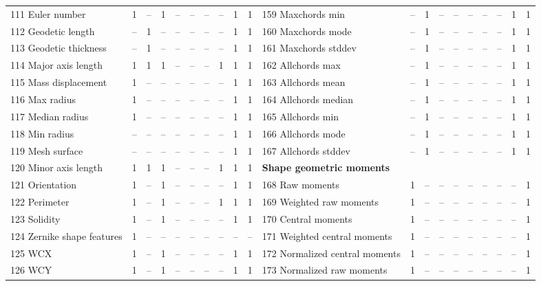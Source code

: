 \documentclass[sn-mathphys,Numbered]{sn-jnl}%
\theoremstyle{thmstyleone}%
\theoremstyle{thmstyletwo}%
\theoremstyle{thmstylethree}%
\begin{document}
\begin{table} [!hbt]
\begin{tiny}
\begin{tabular} {l c c c c c c c c c l c c c c c c c c c }
 111 Euler number & 1 & -- & 1 & -- & -- & -- & -- & 1 & 1 &  159 Maxchords min & -- & 1 & -- & -- & -- & -- & -- & 1 & 1 \\
 112 Geodetic length & -- & 1 & -- & -- & -- & -- & -- & 1 & 1 &  160 Maxchords mode & -- & 1 & -- & -- & -- & -- & -- & 1 & 1 \\
 113 Geodetic thickness & -- & 1 & -- & -- & -- & -- & -- & 1 & 1 &  161 Maxchords stddev & -- & 1 & -- & -- & -- & -- & -- & 1 & 1 \\
 114 Major axis length & 1 & 1 & 1 & -- & -- & -- & 1 & 1 & 1 &  162 Allchords max & -- & 1 & -- & -- & -- & -- & -- & 1 & 1 \\
 115 Mass displacement & 1 & -- & -- & -- & -- & -- & -- & 1 & 1 &  163 Allchords mean & -- & 1 & -- & -- & -- & -- & -- & 1 & 1 \\
 116 Max radius & 1 & -- & -- & -- & -- & -- & -- & 1 & 1 &  164 Allchords median & -- & 1 & -- & -- & -- & -- & -- & 1 & 1 \\
 117 Median radius & 1 & -- & -- & -- & -- & -- & -- & 1 & 1 &  165 Allchords min & -- & 1 & -- & -- & -- & -- & -- & 1 & 1 \\
 118 Min radius & -- & -- & -- & -- & -- & -- & -- & 1 & 1 &  166 Allchords mode & -- & 1 & -- & -- & -- & -- & -- & 1 & 1 \\
 119 Mesh surface & -- & -- & -- & -- & -- & -- & -- & 1 & 1 &  167 Allchords stddev & -- & 1 & -- & -- & -- & -- & -- & 1 & 1 \\
 120 Minor axis length & 1 & 1 & 1 & -- & -- & -- & 1 & 1 & 1 & \hspace{2mm}  \bf Shape geometric moments \rm &  &  &  &  &  &  &  &  &  \\
 121 Orientation & 1 & -- & 1 & -- & -- & -- & -- & 1 & 1 &  168 Raw moments & 1 & -- & -- & -- & -- & -- & -- & -- & 1 \\
 122 Perimeter & 1 & -- & 1 & -- & -- & -- & 1 & 1 & 1 &  169 Weighted raw moments & 1 & -- & -- & -- & -- & -- & -- & -- & 1 \\
 123 Solidity & 1 & -- & 1 & -- & -- & -- & -- & 1 & 1 &  170 Central moments & 1 & -- & -- & -- & -- & -- & -- & -- & 1 \\
 124 Zernike shape features & 1 & -- & -- & -- & -- & -- & -- & -- & -- &  171 Weighted central moments & 1 & -- & -- & -- & -- & -- & -- & -- & 1 \\
 125 WCX & 1 & -- & 1 & -- & -- & -- & -- & 1 & 1 &  172 Normalized central moments & 1 & -- & -- & -- & -- & -- & -- & -- & 1 \\
 126 WCY & 1 & -- & 1 & -- & -- & -- & -- & 1 & 1 &  173 Normalized raw moments & 1 & -- & -- & -- & -- & -- & -- & -- & 1 \\

\end{tabular}
\end{tiny}
\end{table}
\end{document}
